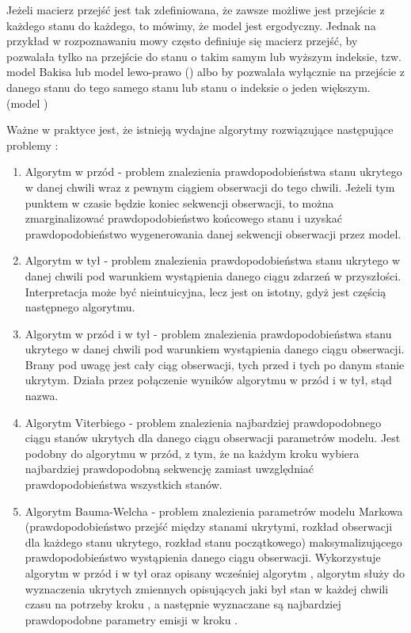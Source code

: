 Jeżeli macierz przejść jest tak zdefiniowana, że zawsze możliwe jest przejście z każdego stanu do każdego, to
mówimy, że model jest ergodyczny. Jednak na przykład w rozpoznawaniu mowy często definiuje się macierz przejść,
by pozwalała tylko na przejście do stanu o takim samym lub wyższym indeksie, tzw. model Bakisa lub model lewo-prawo 
() albo by pozwalała wyłącznie na przejście z danego stanu do tego samego stanu lub stanu
o indeksie o jeden większym. (model )

Ważne w praktyce jest, że istnieją wydajne algorytmy rozwiązujące następujące problemy :

\begin{enumerate}
    \item Algorytm w przód - problem znalezienia prawdopodobieństwa stanu ukrytego w danej chwili wraz z pewnym ciągiem obserwacji do tego chwili. Jeżeli tym punktem w czasie będzie koniec sekwencji obserwacji, to można zmarginalizować prawdopodobieństwo końcowego stanu i uzyskać prawdopodobieństwo wygenerowania danej sekwencji obserwacji przez model.
    \item Algorytm w tył - problem znalezienia prawdopodobieństwa stanu ukrytego w danej chwili pod warunkiem wystąpienia danego ciągu zdarzeń w przyszłości. Interpretacja może być nieintuicyjna, lecz jest on istotny, gdyż jest częścią następnego algorytmu.
    \item Algorytm w przód i w tył - problem znalezienia prawdopodobieństwa stanu ukrytego w danej chwili pod warunkiem wystąpienia danego ciągu obserwacji. Brany pod uwagę jest cały ciąg obserwacji, tych przed i tych po danym stanie ukrytym. Działa przez połączenie wyników algorytmu w przód i w tył, stąd nazwa. 
    \item Algorytm Viterbiego - problem znalezienia najbardziej prawdopodobnego ciągu stanów ukrytych dla danego ciągu obserwacji parametrów modelu. Jest podobny do algorytmu w przód, z tym, że na każdym kroku wybiera najbardziej prawdopodobną sekwencję zamiast uwzględniać prawdopodobieństwa wszystkich stanów.
    \item Algorytm Bauma-Welcha - problem znalezienia parametrów modelu Markowa (prawdopodobieństwo przejść między stanami ukrytymi, rozkład obserwacji dla każdego stanu ukrytego, rozkład stanu początkowego) maksymalizującego prawdopodobieństwo wystąpienia danego ciągu obserwacji. Wykorzystuje algorytm w przód i w tył oraz opisany wcześniej algorytm , algorytm  służy do wyznaczenia ukrytych zmiennych opisujących jaki był stan w każdej chwili czasu na potrzeby kroku , a następnie wyznaczane są najbardziej prawdopodobne parametry emisji w kroku .
\end{enumerate}


